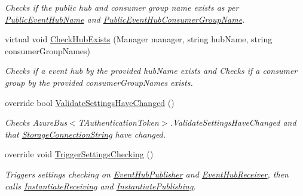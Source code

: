 \begin{DoxyCompactItemize}
\begin{DoxyCompactList}\small\item\em Checks if the public hub and consumer group name exists as per \hyperlink{classCqrs_1_1Azure_1_1ServiceBus_1_1AzureEventHub_a6012f2290f9397929e9d6d5419963482_a6012f2290f9397929e9d6d5419963482}{Public\+Event\+Hub\+Name} and \hyperlink{classCqrs_1_1Azure_1_1ServiceBus_1_1AzureEventHub_a505c495eb73e4f888431d408e0b0d8ab_a505c495eb73e4f888431d408e0b0d8ab}{Public\+Event\+Hub\+Consumer\+Group\+Name}. \end{DoxyCompactList}\item 
virtual void \hyperlink{classCqrs_1_1Azure_1_1ServiceBus_1_1AzureEventHub_a8fe4e3967bbeaa288c893a1d224b2268_a8fe4e3967bbeaa288c893a1d224b2268}{Check\+Hub\+Exists} (Manager manager, string hub\+Name, string consumer\+Group\+Names)
\begin{DoxyCompactList}\small\item\em Checks if a event hub by the provided {\itshape hub\+Name}  exists and Checks if a consumer group by the provided {\itshape consumer\+Group\+Names}  exists. \end{DoxyCompactList}\item 
override bool \hyperlink{classCqrs_1_1Azure_1_1ServiceBus_1_1AzureEventHub_afe8d6f93f97ab5658b81903af555632c_afe8d6f93f97ab5658b81903af555632c}{Validate\+Settings\+Have\+Changed} ()
\begin{DoxyCompactList}\small\item\em Checks Azure\+Bus$<$\+T\+Authentication\+Token$>$.\+Validate\+Settings\+Have\+Changed and that \hyperlink{classCqrs_1_1Azure_1_1ServiceBus_1_1AzureEventHub_a2b102538e8b72f9990578fa3bcbe4c12_a2b102538e8b72f9990578fa3bcbe4c12}{Storage\+Connection\+String} have changed. \end{DoxyCompactList}\item 
override void \hyperlink{classCqrs_1_1Azure_1_1ServiceBus_1_1AzureEventHub_a779ce1115cf00dfaf072056a6ad8f9fe_a779ce1115cf00dfaf072056a6ad8f9fe}{Trigger\+Settings\+Checking} ()
\begin{DoxyCompactList}\small\item\em Triggers settings checking on \hyperlink{classCqrs_1_1Azure_1_1ServiceBus_1_1AzureEventHub_a5f64ce36efaee0f676816c803620d05e_a5f64ce36efaee0f676816c803620d05e}{Event\+Hub\+Publisher} and \hyperlink{classCqrs_1_1Azure_1_1ServiceBus_1_1AzureEventHub_a1b12b47dbb9b9afe2014477a2e457c35_a1b12b47dbb9b9afe2014477a2e457c35}{Event\+Hub\+Receiver}, then calls \hyperlink{classCqrs_1_1Azure_1_1ServiceBus_1_1AzureEventHub_aa725781eddb65bdfe456a4fecb36fb6b_aa725781eddb65bdfe456a4fecb36fb6b}{Instantiate\+Receiving} and \hyperlink{classCqrs_1_1Azure_1_1ServiceBus_1_1AzureEventHub_a3747fb9fcb3de2a72c8a6d7bbd92db95_a3747fb9fcb3de2a72c8a6d7bbd92db95}{Instantiate\+Publishing}. \end{DoxyCompactList}\item 

\end{DoxyCompactItemize}
